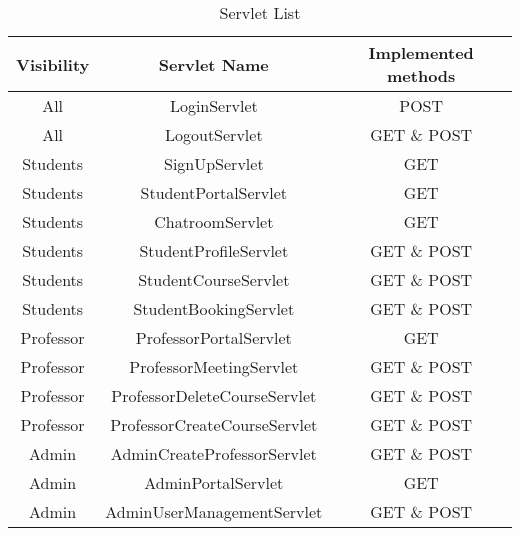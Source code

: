 \begin{table}[h]
\centering
\caption{Servlet List}
\label{tab:servlets}
\begin{tabular}{|c|c|c|}
\hline
\textbf{Visibility} & \textbf{Servlet Name} & \textbf{Implemented methods} \\ \hline
All & LoginServlet & POST\\ \hline
All & LogoutServlet & GET \& POST\\ \hline
Students & SignUpServlet & GET\\ \hline
Students & StudentPortalServlet & GET\\ \hline
Students & ChatroomServlet & GET\\ \hline
Students & StudentProfileServlet & GET \& POST\\ \hline
Students & StudentCourseServlet & GET \& POST\\ \hline
Students & StudentBookingServlet & GET \& POST\\ \hline
Professor & ProfessorPortalServlet & GET\\ \hline
Professor & ProfessorMeetingServlet & GET \& POST\\ \hline
Professor & ProfessorDeleteCourseServlet & GET \& POST\\ \hline
Professor & ProfessorCreateCourseServlet & GET \& POST\\ \hline
Admin & AdminCreateProfessorServlet & GET \& POST\\ \hline
Admin & AdminPortalServlet & GET\\ \hline
Admin & AdminUserManagementServlet & GET \& POST\\ \hline
\end{tabular}
\end{table}
